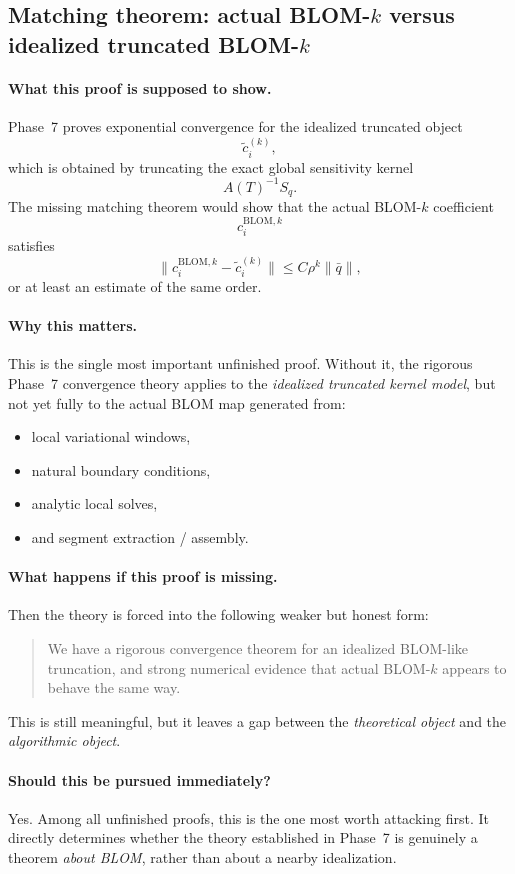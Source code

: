 \subsection{Matching theorem: actual BLOM-\texorpdfstring{$k$}{k} versus idealized truncated BLOM-\texorpdfstring{$k$}{k}}
\label{subsec:unfinished_matching}

\paragraph{What this proof is supposed to show.}
Phase~7 proves exponential convergence for the idealized truncated object
\[
\tilde c_i^{(k)},
\]
which is obtained by truncating the exact global sensitivity kernel
\[
A(T)^{-1}S_q.
\]
The missing matching theorem would show that the actual BLOM-\(k\) coefficient
\[
c_i^{\mathrm{BLOM},k}
\]
satisfies
\[
\|c_i^{\mathrm{BLOM},k}-\tilde c_i^{(k)}\|\le C\rho^k\|\bar q\|,
\]
or at least an estimate of the same order.

\paragraph{Why this matters.}
This is the single most important unfinished proof.
Without it, the rigorous Phase~7 convergence theory applies to the \emph{idealized truncated kernel model}, but not yet fully to the actual BLOM map generated from:
\begin{itemize}
	\item local variational windows,
	\item natural boundary conditions,
	\item analytic local solves,
	\item and segment extraction / assembly.
\end{itemize}

\paragraph{What happens if this proof is missing.}
Then the theory is forced into the following weaker but honest form:
\begin{quote}
	We have a rigorous convergence theorem for an idealized BLOM-like truncation, and strong numerical evidence that actual BLOM-\(k\) appears to behave the same way.
\end{quote}
This is still meaningful, but it leaves a gap between the \emph{theoretical object} and the \emph{algorithmic object}.

\paragraph{Should this be pursued immediately?}
Yes.
Among all unfinished proofs, this is the one most worth attacking first.
It directly determines whether the theory established in Phase~7 is genuinely a theorem \emph{about BLOM}, rather than about a nearby idealization.

